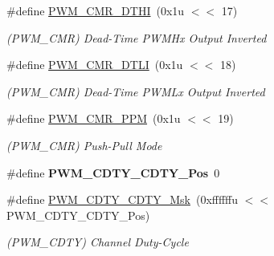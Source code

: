 \begin{DoxyCompactItemize}
\mbox{\label{group__SAMV71__PWM_gaab717ec6a8d10c26426079bd5f86e9b2}} 
\#define \mbox{\hyperlink{group__SAMV71__PWM_gaab717ec6a8d10c26426079bd5f86e9b2}{P\+W\+M\+\_\+\+C\+M\+R\+\_\+\+D\+T\+HI}}~(0x1u $<$$<$ 17)
\begin{DoxyCompactList}\small\item\em (P\+W\+M\+\_\+\+C\+MR) Dead-\/\+Time P\+W\+M\+Hx Output Inverted \end{DoxyCompactList}\item 
\mbox{\label{group__SAMV71__PWM_gaa403af8b6427a80c569435793bc32a30}} 
\#define \mbox{\hyperlink{group__SAMV71__PWM_gaa403af8b6427a80c569435793bc32a30}{P\+W\+M\+\_\+\+C\+M\+R\+\_\+\+D\+T\+LI}}~(0x1u $<$$<$ 18)
\begin{DoxyCompactList}\small\item\em (P\+W\+M\+\_\+\+C\+MR) Dead-\/\+Time P\+W\+M\+Lx Output Inverted \end{DoxyCompactList}\item 
\mbox{\label{group__SAMV71__PWM_ga8e3a78a54d45a88c4de5489532254612}} 
\#define \mbox{\hyperlink{group__SAMV71__PWM_ga8e3a78a54d45a88c4de5489532254612}{P\+W\+M\+\_\+\+C\+M\+R\+\_\+\+P\+PM}}~(0x1u $<$$<$ 19)
\begin{DoxyCompactList}\small\item\em (P\+W\+M\+\_\+\+C\+MR) Push-\/\+Pull Mode \end{DoxyCompactList}\item 
\mbox{\label{group__SAMV71__PWM_gad9c53da07d308aaa980f5d3e997be72c}} 
\#define {\bfseries P\+W\+M\+\_\+\+C\+D\+T\+Y\+\_\+\+C\+D\+T\+Y\+\_\+\+Pos}~0
\item 
\mbox{\label{group__SAMV71__PWM_gaed15d16af3f59ccddcf4f629ea3c5852}} 
\#define \mbox{\hyperlink{group__SAMV71__PWM_gaed15d16af3f59ccddcf4f629ea3c5852}{P\+W\+M\+\_\+\+C\+D\+T\+Y\+\_\+\+C\+D\+T\+Y\+\_\+\+Msk}}~(0xffffffu $<$$<$ P\+W\+M\+\_\+\+C\+D\+T\+Y\+\_\+\+C\+D\+T\+Y\+\_\+\+Pos)
\begin{DoxyCompactList}\small\item\em (P\+W\+M\+\_\+\+C\+D\+TY) Channel Duty-\/\+Cycle \end{DoxyCompactList}\item 
\mbox{\label{group__SAMV71__PWM_ga41fa252ae7e9c1afb1ed033146edabff}} 

\end{DoxyCompactItemize}
